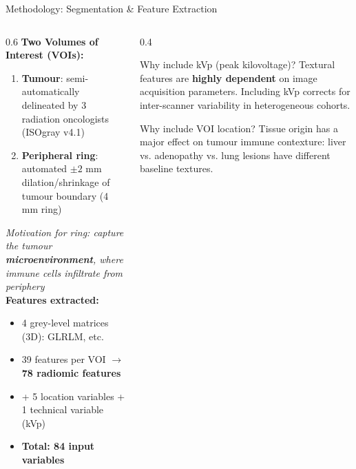 \documentclass[aspectratio=1610]{beamer}
\begin{document}
\begin{frame}{Methodology: Segmentation \& Feature Extraction}
    \begin{columns}
        \begin{column}{0.6\textwidth}
            \small
            \textbf{Two Volumes of Interest (VOIs):}
            \begin{enumerate}
                \small
                \item \textbf{Tumour}: semi-automatically delineated by 3 radiation oncologists (ISOgray v4.1)
                \item \textbf{Peripheral ring}: automated $\pm 2$ mm dilation/shrinkage of tumour boundary (4 mm ring)
            \end{enumerate}
       
            \textit{Motivation for ring: capture the tumour \textbf{microenvironment}, where immune cells infiltrate from periphery}\\

            \textbf{Features extracted:}
            \begin{itemize}
                \small
                \item 4 grey-level matrices (3D): GLRLM, etc.
                \item 39 features per VOI $\rightarrow$ \textbf{78 radiomic features}
                \item + 5 location variables + 1 technical variable (kVp)
                \item \textbf{Total: 84 input variables}
            \end{itemize}
        \end{column}
        \begin{column}{0.4\textwidth}
            \begin{alertblock}{Why include kVp (peak kilovoltage)?}
                Textural features are \textbf{highly dependent} on image acquisition parameters. Including kVp corrects for inter-scanner variability in heterogeneous cohorts.
            \end{alertblock}
            \begin{exampleblock}{Why include VOI location?}
                Tissue origin has a major effect on tumour immune contexture: liver vs. adenopathy vs. lung lesions have different baseline textures.
            \end{exampleblock}
        \end{column}
    \end{columns}
\end{frame}
\end{document}
